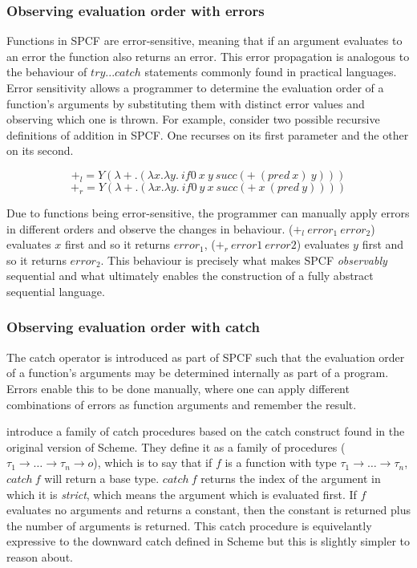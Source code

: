 \documentclass[12pt,a4paper]{report}
\theoremstyle{definition}
\theoremstyle{definition}
\theoremstyle{remark}
\begin{document}
\subsubsection{Observing evaluation order with errors}\label{section: observing sequentiality}
Functions in SPCF are error-sensitive, meaning that if an argument evaluates to an error the function also returns an error. This error propagation is analogous to the behaviour of $try...catch$ statements commonly found in practical languages. Error sensitivity allows a programmer to determine the evaluation order of a function's arguments by substituting them with distinct error values and observing which one is thrown. For example, consider two possible recursive definitions of addition in SPCF. One recurses on its first parameter and the other on its second.

\[+_l = Y(\lambda+.(\lambda x.\lambda y.\ if0\ x\ y\ succ (+\ (pred\ x)\ y)))\]
\[+_r = Y(\lambda+.(\lambda x.\lambda y.\ if0\ y\ x\ succ (+\ x\ (pred\ y))))\]

Due to functions being error-sensitive, the programmer can manually apply errors in different orders and observe the changes in behaviour. ($+_l\ error_1\ error_2$) evaluates $x$ first and so it returns $error_1$, ($+_r\ error1\ error2$) evaluates $y$ first and so it returns $error_2$. This behaviour is precisely what makes SPCF \textit{observably} sequential and what ultimately enables the construction of a fully abstract sequential language. 

\subsubsection{Observing evaluation order with catch}
The catch operator is introduced as part of SPCF such that the evaluation order of a function's arguments may be determined internally as part of a program. Errors enable this to be done manually, where one can apply different combinations of errors as function arguments and remember the result. 

\cite{cartwright_1992} introduce a family of catch procedures based on the catch construct found in the original version of Scheme. They define it as a family of procedures ($\tau_1 \rightarrow \dots \rightarrow \tau_n \rightarrow o$), which is to say that if $f$ is a function with type $\tau_1 \rightarrow \dots \rightarrow \tau_n$, $catch\ f$ will return a base type. $catch\ f$ returns the index of the argument in which it is \emph{strict}, which means the argument which is evaluated first. If $f$ evaluates no arguments and returns a constant, then the constant is returned plus the number of arguments is returned. This catch procedure is equivelantly expressive to the downward catch defined in Scheme but this is slightly simpler to reason about. 
\end{document}
